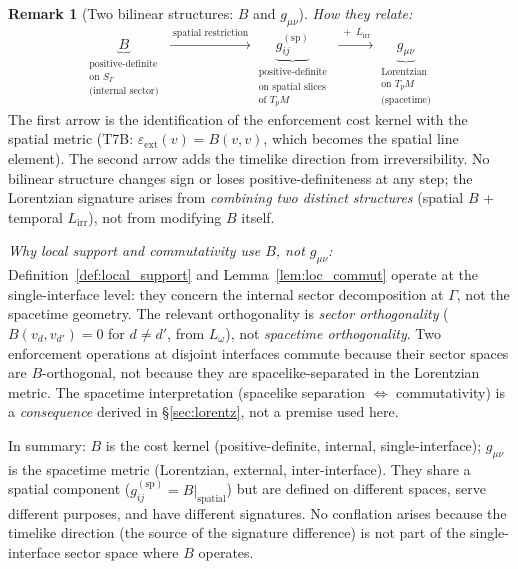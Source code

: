 \documentclass[11pt,a4paper]{article}
\theoremstyle{definition}
\newtheorem{remark}[theorem]{Remark}
\begin{document}
\begin{remark}[Two bilinear structures: $B$ and $g_{\mu\nu}$]
\smallskip\noindent\textit{How they relate:}\quad
\[
  \underbrace{B}_{
    \substack{\text{positive-definite}\\
              \text{on } S_\Gamma\\
              \text{(internal sector)}}}
  \;\xrightarrow{\;\text{spatial restriction}\;}
  \underbrace{g_{ij}^{(\mathrm{sp})}}_{
    \substack{\text{positive-definite}\\
              \text{on spatial slices}\\
              \text{of } T_pM}}
  \;\xrightarrow{\;+\; L_{\mathrm{irr}}\;}
  \underbrace{g_{\mu\nu}}_{
    \substack{\text{Lorentzian}\\
              \text{on } T_pM\\
              \text{(spacetime)}}}
\]
The first arrow is the identification of the enforcement cost kernel
with the spatial metric (T7B: $\varepsilon_{\mathrm{ext}}(v) = B(v,v)$,
which becomes the spatial line element).  The second arrow adds the
timelike direction from irreversibility.  No bilinear structure changes
sign or loses positive-definiteness at any step; the Lorentzian
signature arises from \emph{combining two distinct structures}
(spatial $B$ + temporal $L_{\mathrm{irr}}$), not from modifying $B$
itself.

\smallskip\noindent\textit{Why local support and commutativity use $B$,
not $g_{\mu\nu}$:}\quad
Definition~\ref{def:local_support} and Lemma~\ref{lem:loc_commut}
operate at the single-interface level: they concern the internal sector
decomposition at $\Gamma$, not the spacetime geometry.  The relevant
orthogonality is \emph{sector orthogonality} ($B(v_d, v_{d'}) = 0$
for $d \ne d'$, from $L_\omega$), not \emph{spacetime orthogonality}.
Two enforcement operations at disjoint interfaces commute because their
sector spaces are $B$-orthogonal, not because they are spacelike-separated
in the Lorentzian metric.  The spacetime interpretation (spacelike
separation $\Leftrightarrow$ commutativity) is a \emph{consequence}
derived in \S\ref{sec:lorentz}, not a premise used here.

In summary: $B$ is the cost kernel (positive-definite, internal,
single-interface); $g_{\mu\nu}$ is the spacetime metric (Lorentzian,
external, inter-interface).  They share a spatial component
($g_{ij}^{(\mathrm{sp})} = B|_{\mathrm{spatial}}$) but are defined on
different spaces, serve different purposes, and have different
signatures.  No conflation arises because the timelike direction
(the source of the signature difference) is not part of the
single-interface sector space where $B$ operates.
\end{remark}
\end{document}

